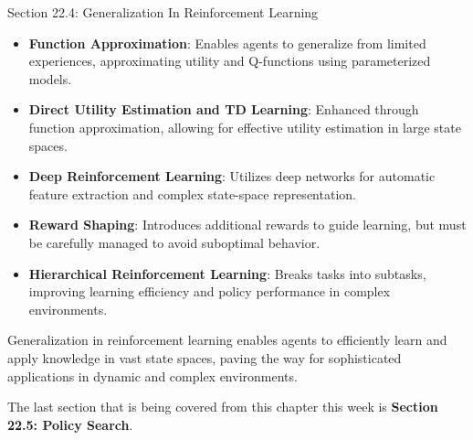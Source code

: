 \begin{notes}{Section 22.4: Generalization In Reinforcement Learning}
\begin{highlight}
        \begin{itemize}
            \item \textbf{Function Approximation}: Enables agents to generalize from limited experiences, approximating utility and Q-functions using parameterized models.
            \item \textbf{Direct Utility Estimation and TD Learning}: Enhanced through function approximation, allowing for effective utility estimation in large state spaces.
            \item \textbf{Deep Reinforcement Learning}: Utilizes deep networks for automatic feature extraction and complex state-space representation.
            \item \textbf{Reward Shaping}: Introduces additional rewards to guide learning, but must be carefully managed to avoid suboptimal behavior.
            \item \textbf{Hierarchical Reinforcement Learning}: Breaks tasks into subtasks, improving learning efficiency and policy performance in complex environments.
        \end{itemize}
    
        Generalization in reinforcement learning enables agents to efficiently learn and apply knowledge in vast state spaces, paving the way for sophisticated applications in dynamic and complex environments.
    
    \end{highlight}
\end{notes}

The last section that is being covered from this chapter this week is \textbf{Section 22.5: Policy Search}.

